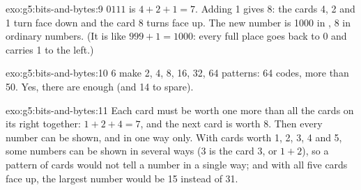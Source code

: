 \begin{solution}{exo:g5:bits-and-bytes:9}
$0111$ is $4 + 2 + 1 = 7$. Adding 1 gives 8: the cards 4, 2 and 1 turn face
down and the card 8 turns face up. The new number is 1000 in , 8 in
ordinary numbers. (It is like $999 + 1 = 1000$: every full place goes back to
0 and carries 1 to the left.)
\end{solution}

\begin{solution}{exo:g5:bits-and-bytes:10}
6  make 2, 4, 8, 16, 32, 64 patterns: 64 codes, more than 50. Yes, there
are enough (and 14 to spare).
\end{solution}

\begin{solution}{exo:g5:bits-and-bytes:11}
Each card must be worth one more than all the cards on its right together:
$1 + 2 + 4 = 7$, and the next card is worth 8. Then every number can be shown,
and in one way only. With cards worth 1, 2, 3, 4 and 5, some numbers can be
shown in several ways (3 is the card 3, or $1 + 2$), so a pattern of cards would
not tell a number in a single way; and with all five cards face up, the
largest number would be 15 instead of 31.
\end{solution}
